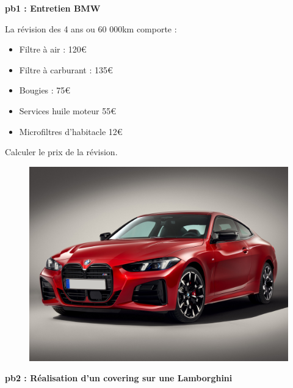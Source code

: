 \textbf{pb1 : Entretien BMW} \\

\begin{multicols}{2}
La révision des 4 ans ou 60 000km comporte : 

\begin{itemize}[label={$\bullet$}]
  \item Filtre à air : 120€
  \item Filtre à carburant : 135€
  \item Bougies : 75€ 
  \item Services huile moteur 55€
  \item Microfiltres d'habitacle 12€  
\end{itemize} 

Calculer le prix de la révision. \columnbreak

\begin{figure}[H]
  \centering
  \includegraphics[width=0.6\linewidth]{5x2-inegalite-triangulaire/bmw.jpg}
\end{figure}
\end{multicols}

\textbf{pb2 : Réalisation d'un covering sur une Lamborghini} \\

